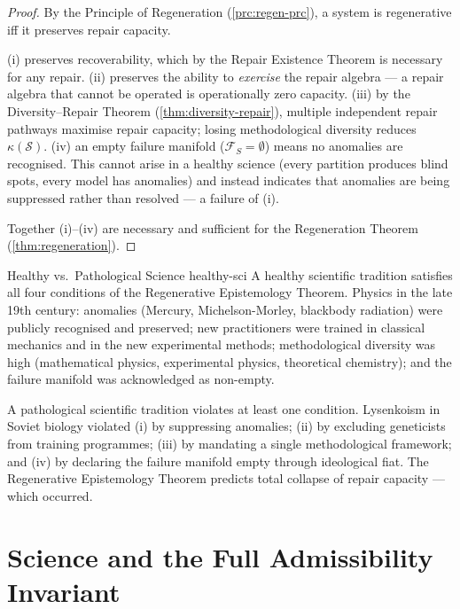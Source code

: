 \documentclass[12pt,twoside,openright]{book}
\newcounter{exercise}[chapter]
\begin{document}
\begin{proof}
  By the Principle of Regeneration
  (\cref{prc:regen-prc}), a system is regenerative
  iff it preserves repair capacity.

  (i) preserves recoverability, which by the Repair
  Existence Theorem is necessary for any repair.
  (ii) preserves the ability to \emph{exercise} the
  repair algebra — a repair algebra that cannot be
  operated is operationally zero capacity.
  (iii) by the Diversity--Repair Theorem
  (\cref{thm:diversity-repair}), multiple independent
  repair pathways maximise repair capacity; losing
  methodological diversity reduces $\kappa(\mathcal{S})$.
  (iv) an empty failure manifold ($\mathcal{F}_S = \emptyset$)
  means no anomalies are recognised. This cannot arise
  in a healthy science (every partition produces blind
  spots, every model has anomalies) and instead
  indicates that anomalies are being suppressed rather
  than resolved — a failure of (i).

  Together (i)--(iv) are necessary and sufficient for
  the Regeneration Theorem (\cref{thm:regeneration}).
\end{proof}

\begin{example}{Healthy vs.\ Pathological Science}%
  {healthy-sci}
  A healthy scientific tradition satisfies all four
  conditions of the Regenerative Epistemology Theorem.
  Physics in the late 19th century: anomalies (Mercury,
  Michelson-Morley, blackbody radiation) were
  publicly recognised and preserved; new practitioners
  were trained in classical mechanics and in the new
  experimental methods; methodological diversity was
  high (mathematical physics, experimental physics,
  theoretical chemistry); and the failure manifold
  was acknowledged as non-empty.

  A pathological scientific tradition violates at
  least one condition. Lysenkoism in Soviet biology
  violated (i) by suppressing anomalies; (ii) by
  excluding geneticists from training programmes;
  (iii) by mandating a single methodological framework;
  and (iv) by declaring the failure manifold empty
  through ideological fiat.
  The Regenerative Epistemology Theorem predicts
  total collapse of repair capacity — which occurred.
\end{example}

\section{Science and the Full Admissibility Invariant}
\end{document}
